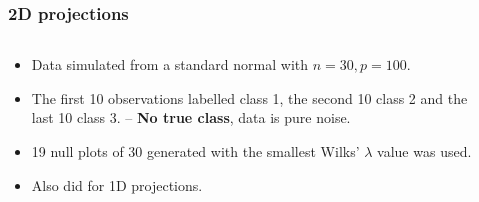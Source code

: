 \documentclass{beamer}
\begin{document}
\begin{frame}
  \frametitle{ 2D projections}
	\begin{columns}
		\begin{column}{0.4\textwidth}
		  \begin{itemize}
			  \item Data simulated from a standard normal with $n=30, p=100$.
			  \item The first 10 observations labelled class 1, the second 10 class 2 and the last 10 class 3. 
			 -- {\bf No true class}, data is pure noise.
			\item 19 null plots of 30 generated with the smallest Wilks' $\lambda$ value was used. 
			\item Also did for 1D projections.
		  \end{itemize}		
			
		\end{column}
		
		\begin{column}{0.6\textwidth}
			 \begin{center}  \end{center}
		\end{column}
	\end{columns}  
\end{frame} 
\end{document}
